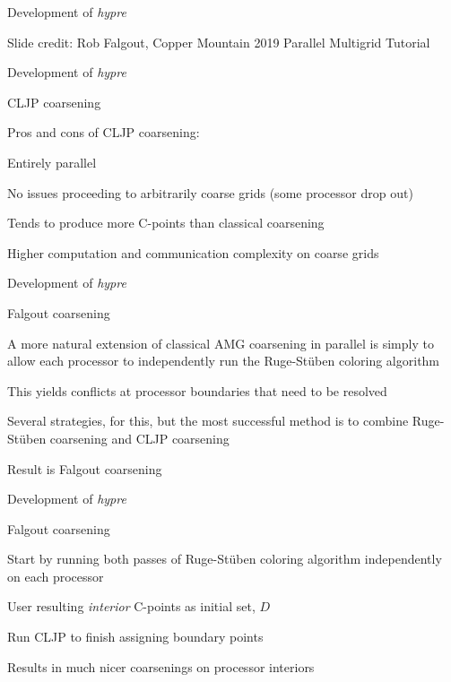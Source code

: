 \documentclass[18pt,xcolor=table]{beamer}
\begin{document}
\begin{frame}{Development of \emph{hypre}}
{\begin{center}
\end{center}}
\tiny{Slide credit: Rob Falgout, Copper Mountain 2019 Parallel Multigrid Tutorial}
\end{frame}

\begin{frame}{Development of \emph{hypre}}
\begin{block}{CLJP coarsening}
\bit
\item Pros and cons of CLJP coarsening:
\bit
\item Entirely parallel
\item No issues proceeding to arbitrarily coarse grids (some processor drop out)
\item Tends to produce more C-points than classical coarsening 
\item Higher computation and communication complexity on coarse grids
\eit
\eit
\end{block}
\end{frame}

\begin{frame}{Development of \emph{hypre}}
\begin{block}{Falgout coarsening}
\bit
\item A more natural extension of classical AMG coarsening in parallel is simply to allow each processor to independently run the Ruge-St\"uben coloring algorithm
\item This yields conflicts at processor boundaries that need to be resolved
\item Several strategies, for this, but the most successful method is to combine Ruge-St\"uben coarsening and CLJP coarsening
\item Result is Falgout coarsening
\eit
\end{block}
\end{frame}

\begin{frame}{Development of \emph{hypre}}
\begin{block}{Falgout coarsening}
\bit
\item Start by running both passes of Ruge-St\"uben coloring algorithm independently on each processor
\item User resulting \emph{interior} C-points as initial set, $D$
\item Run CLJP to finish assigning boundary points
\item Results in much nicer coarsenings on processor interiors 
\eit
\end{block}
\end{frame}
\end{document}
